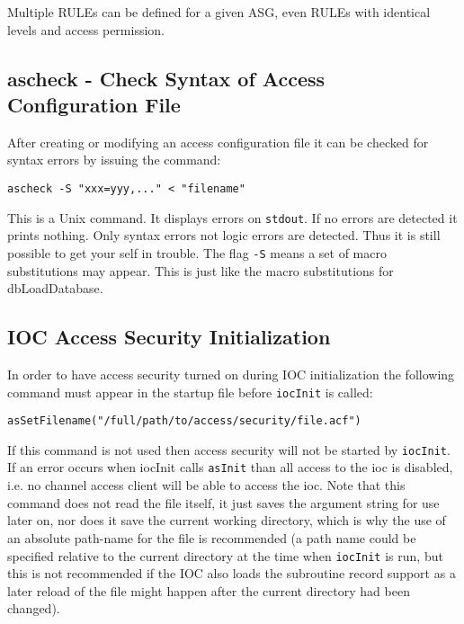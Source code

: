 Multiple RULEs can be defined for a given ASG, even RULEs with identical levels and access permission.

\subsection{ascheck - Check Syntax of Access Configuration File}

After creating or modifying an access configuration file it can be checked for syntax errors by issuing the command:

\begin{verbatim}
ascheck -S "xxx=yyy,..." < "filename"
\end{verbatim}

This is a Unix command. It displays errors on \verb|stdout|. If no errors are detected it prints nothing. Only syntax errors not 
logic errors are detected. Thus it is still possible to get your self in trouble. The flag \verb|-S| means a set of macro 
substitutions may appear. This is just like the macro substitutions for dbLoadDatabase.

\subsection{IOC Access Security Initialization}

In order to have access security turned on during IOC initialization the following command must appear in the startup file 
before \verb|iocInit| is called:

\begin{verbatim}
asSetFilename("/full/path/to/access/security/file.acf")
\end{verbatim}

If this command is not used then access security will not be started by \verb|iocInit|. If an error occurs when iocInit calls 
\verb|asInit| than all access to the ioc is disabled, i.e. no channel access client will be able to access the ioc. Note that this 
command does not read the file itself, it just saves the argument string for use later on, nor does it save the current 
working directory, which is why the use of an absolute path-name for the file is recommended (a path name could be 
specified relative to the current directory at the time when \verb|iocInit| is run, but this is not recommended if the IOC also 
loads the subroutine record support as a later reload of the file might happen after the current directory had been changed).

